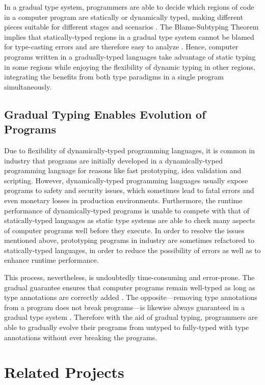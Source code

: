 In a gradual type system, programmers are able to decide which regions of code in a computer program are statically or dynamically typed, making different pieces suitable for different stages and scenarios \cite{siek2006gradual}. The Blame-Subtyping Theorem implies that statically-typed regions in a gradual type system cannot be blamed for type-casting errors and are therefore easy to analyze \cite{siek2015refined}. Hence, computer programs written in a gradually-typed languages take advantage of static typing in some regions while enjoying the flexibility of dynamic typing in other regions, integrating the benefits from both type paradigms in a single program simultaneously.

\subsection{Gradual Typing Enables Evolution of Programs}
Due to flexibility of dynamically-typed programming languages, it is common in industry that programs are initially developed in a dynamically-typed programming language for reasons like fast prototyping, idea validation and scripting. However, dynamically-typed programming languages usually expose programs to safety and security issues, which sometimes lead to fatal errors and even monetary losses in production environments. Furthermore, the runtime performance of dynamically-typed programs is unable to compete with that of statically-typed languages as static type systems are able to check many aspects of computer programs well before they execute. In order to resolve the issues mentioned above, prototyping programs in industry are sometimes refactored to statically-typed languages, in order to reduce the possibility of errors as well as to enhance runtime performance.

This process, nevertheless, is undoubtedly time-consuming and error-prone. The gradual guarantee ensures that computer programs remain well-typed as long as type annotations are correctly added \cite{siek2015refined}. The opposite---removing type annotations from a program does not break programs---is likewise always guaranteed in a gradual type system \cite{siek2015refined}. Therefore with the aid of gradual typing, programmers are able to gradually evolve their programs from untyped to fully-typed with type annotations without ever breaking the programs.

\section{Related Projects}
 
